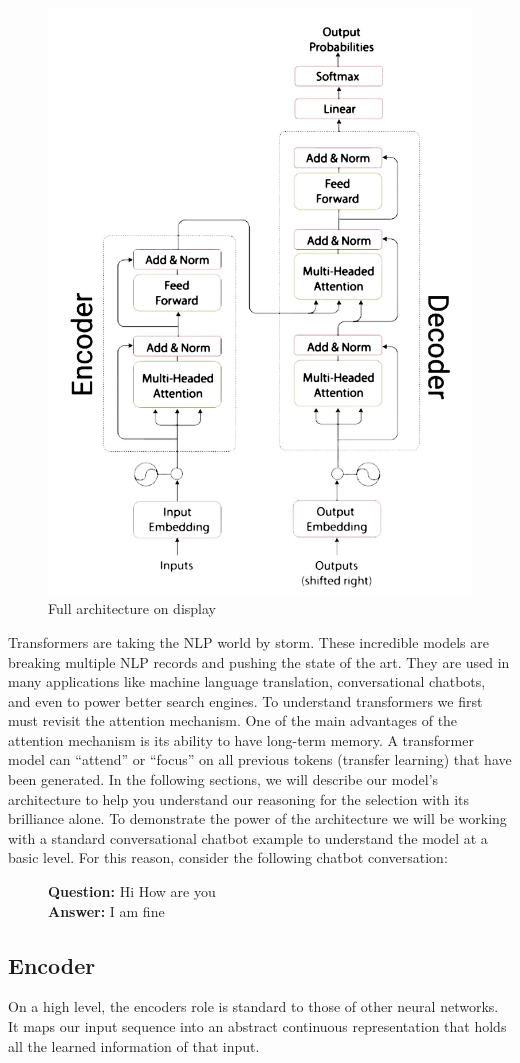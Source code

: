 \begin{figure}[H]
\centering
\includegraphics[width=.45\textwidth]{figures/t1.jpg}
\caption{Full architecture on display}
\end{figure}

Transformers are taking the NLP world by storm. These incredible models are breaking multiple NLP records and pushing the state of the art. They are used in many applications like machine language translation, conversational chatbots, and even to power better search engines. To understand transformers we first must revisit the attention mechanism. One of the main advantages of the attention mechanism is its ability to have long-term memory. A transformer model can “attend” or “focus” on all previous tokens (transfer learning) that have been generated. In the following sections, we will describe our model's architecture to help you understand our reasoning for the selection with its brilliance alone. To demonstrate the power of the architecture we will be working with a standard conversational chatbot example to understand the model at a basic level. For this reason, consider the following chatbot conversation:

\begin{figure}[H]
\centering
\textbf{Question:} Hi How are you\\
\textbf{Answer:} I am fine
\end{figure}

\subsection{Encoder}
\noindent
On a high level, the encoders role is standard to those of other neural networks. It maps our input sequence into an abstract continuous representation that holds all the learned information of that input. \\

